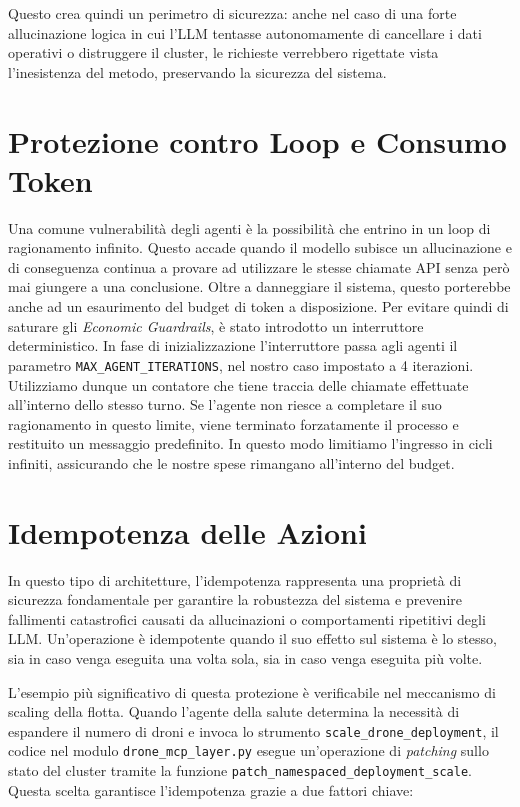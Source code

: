 Questo crea quindi un perimetro di sicurezza: anche nel caso di una forte allucinazione logica in cui l'LLM tentasse autonomamente di cancellare i dati operativi o distruggere il cluster, le richieste verrebbero rigettate vista l'inesistenza del metodo, preservando la sicurezza del sistema.

\section{Protezione contro Loop e Consumo Token}
\label{sec:protezione_loop}
Una comune vulnerabilità degli agenti è la possibilità che entrino in un loop di ragionamento infinito. Questo accade quando il modello subisce un allucinazione e di conseguenza continua a provare ad utilizzare le stesse chiamate API senza però mai giungere a una conclusione. Oltre a danneggiare il sistema, questo porterebbe anche ad un esaurimento del budget di token a disposizione. Per evitare quindi di saturare gli \textit{Economic Guardrails}, è stato introdotto un interruttore deterministico. In fase di inizializzazione l'interruttore passa agli agenti il parametro \texttt{MAX\_AGENT\_ITERATIONS}, nel nostro caso impostato a 4 iterazioni. Utilizziamo dunque un contatore che tiene traccia delle chiamate effettuate all'interno dello stesso turno. Se l'agente non riesce a completare il suo ragionamento in questo limite, viene terminato forzatamente il processo e restituito un messaggio predefinito. In questo modo limitiamo l'ingresso in cicli infiniti, assicurando che le nostre spese rimangano all'interno del budget. 

\section{Idempotenza delle Azioni}
\label{sec:idempotenza_azioni}
In questo tipo di architetture, l'idempotenza rappresenta una proprietà di sicurezza fondamentale per garantire la robustezza del sistema e prevenire fallimenti catastrofici causati da allucinazioni o comportamenti ripetitivi degli LLM. Un'operazione è idempotente quando il suo effetto sul sistema è lo stesso, sia in caso venga eseguita una volta sola, sia in caso venga eseguita più volte.

L'esempio più significativo di questa protezione è verificabile nel meccanismo di scaling della flotta. Quando l'agente della salute determina la necessità di espandere il numero di droni e invoca lo strumento \texttt{scale\_drone\_deployment}, il codice nel modulo \texttt{drone\_mcp\_layer.py} esegue un'operazione di \textit{patching} sullo stato del cluster tramite la funzione \texttt{patch\_namespaced\_deployment\_scale}. 
Questa scelta garantisce l'idempotenza grazie a due fattori chiave:

